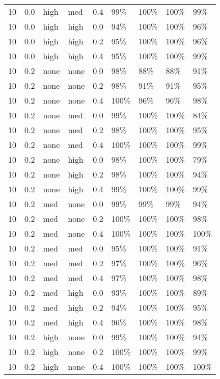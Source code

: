 \begin{longtable}{rrllrllll}
  10 & 0.0 & high & med & 0.4 & 99\% & 100\% & 100\% & 99\% \\ 
  10 & 0.0 & high & high & 0.0 & 94\% & 100\% & 100\% & 96\% \\ 
  10 & 0.0 & high & high & 0.2 & 95\% & 100\% & 100\% & 96\% \\ 
  10 & 0.0 & high & high & 0.4 & 95\% & 100\% & 100\% & 99\% \\ 
  10 & 0.2 & none & none & 0.0 & 98\% & 88\% & 88\% & 91\% \\ 
  10 & 0.2 & none & none & 0.2 & 98\% & 91\% & 91\% & 95\% \\ 
  10 & 0.2 & none & none & 0.4 & 100\% & 96\% & 96\% & 98\% \\ 
  10 & 0.2 & none & med & 0.0 & 99\% & 100\% & 100\% & 84\% \\ 
  10 & 0.2 & none & med & 0.2 & 98\% & 100\% & 100\% & 95\% \\ 
  10 & 0.2 & none & med & 0.4 & 100\% & 100\% & 100\% & 99\% \\ 
  10 & 0.2 & none & high & 0.0 & 98\% & 100\% & 100\% & 79\% \\ 
  10 & 0.2 & none & high & 0.2 & 98\% & 100\% & 100\% & 94\% \\ 
  10 & 0.2 & none & high & 0.4 & 99\% & 100\% & 100\% & 99\% \\ 
  10 & 0.2 & med & none & 0.0 & 99\% & 99\% & 99\% & 94\% \\ 
  10 & 0.2 & med & none & 0.2 & 100\% & 100\% & 100\% & 98\% \\ 
  10 & 0.2 & med & none & 0.4 & 100\% & 100\% & 100\% & 100\% \\ 
  10 & 0.2 & med & med & 0.0 & 95\% & 100\% & 100\% & 91\% \\ 
  10 & 0.2 & med & med & 0.2 & 97\% & 100\% & 100\% & 96\% \\ 
  10 & 0.2 & med & med & 0.4 & 97\% & 100\% & 100\% & 98\% \\ 
  10 & 0.2 & med & high & 0.0 & 93\% & 100\% & 100\% & 89\% \\ 
  10 & 0.2 & med & high & 0.2 & 94\% & 100\% & 100\% & 95\% \\ 
  10 & 0.2 & med & high & 0.4 & 96\% & 100\% & 100\% & 98\% \\ 
  10 & 0.2 & high & none & 0.0 & 99\% & 100\% & 100\% & 94\% \\ 
  10 & 0.2 & high & none & 0.2 & 100\% & 100\% & 100\% & 99\% \\ 
  10 & 0.2 & high & none & 0.4 & 100\% & 100\% & 100\% & 100\% \\ 

\end{longtable}
